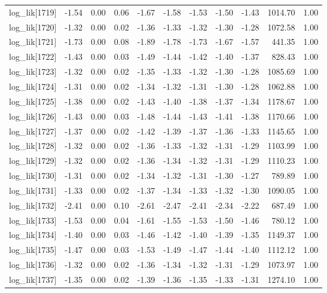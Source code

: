 \begin{table}[ht]
\begin{tabular}{rrrrrrrrrrr}
  log\_lik[1719] & -1.54 & 0.00 & 0.06 & -1.67 & -1.58 & -1.53 & -1.50 & -1.43 & 1014.70 & 1.00 \\ 
  log\_lik[1720] & -1.32 & 0.00 & 0.02 & -1.36 & -1.33 & -1.32 & -1.30 & -1.28 & 1072.58 & 1.00 \\ 
  log\_lik[1721] & -1.73 & 0.00 & 0.08 & -1.89 & -1.78 & -1.73 & -1.67 & -1.57 & 441.35 & 1.00 \\ 
  log\_lik[1722] & -1.43 & 0.00 & 0.03 & -1.49 & -1.44 & -1.42 & -1.40 & -1.37 & 828.43 & 1.00 \\ 
  log\_lik[1723] & -1.32 & 0.00 & 0.02 & -1.35 & -1.33 & -1.32 & -1.30 & -1.28 & 1085.69 & 1.00 \\ 
  log\_lik[1724] & -1.31 & 0.00 & 0.02 & -1.34 & -1.32 & -1.31 & -1.30 & -1.28 & 1062.88 & 1.00 \\ 
  log\_lik[1725] & -1.38 & 0.00 & 0.02 & -1.43 & -1.40 & -1.38 & -1.37 & -1.34 & 1178.67 & 1.00 \\ 
  log\_lik[1726] & -1.43 & 0.00 & 0.03 & -1.48 & -1.44 & -1.43 & -1.41 & -1.38 & 1170.66 & 1.00 \\ 
  log\_lik[1727] & -1.37 & 0.00 & 0.02 & -1.42 & -1.39 & -1.37 & -1.36 & -1.33 & 1145.65 & 1.00 \\ 
  log\_lik[1728] & -1.32 & 0.00 & 0.02 & -1.36 & -1.33 & -1.32 & -1.31 & -1.29 & 1103.99 & 1.00 \\ 
  log\_lik[1729] & -1.32 & 0.00 & 0.02 & -1.36 & -1.34 & -1.32 & -1.31 & -1.29 & 1110.23 & 1.00 \\ 
  log\_lik[1730] & -1.31 & 0.00 & 0.02 & -1.34 & -1.32 & -1.31 & -1.30 & -1.27 & 789.89 & 1.00 \\ 
  log\_lik[1731] & -1.33 & 0.00 & 0.02 & -1.37 & -1.34 & -1.33 & -1.32 & -1.30 & 1090.05 & 1.00 \\ 
  log\_lik[1732] & -2.41 & 0.00 & 0.10 & -2.61 & -2.47 & -2.41 & -2.34 & -2.22 & 687.49 & 1.00 \\ 
  log\_lik[1733] & -1.53 & 0.00 & 0.04 & -1.61 & -1.55 & -1.53 & -1.50 & -1.46 & 780.12 & 1.00 \\ 
  log\_lik[1734] & -1.40 & 0.00 & 0.03 & -1.46 & -1.42 & -1.40 & -1.39 & -1.35 & 1149.37 & 1.00 \\ 
  log\_lik[1735] & -1.47 & 0.00 & 0.03 & -1.53 & -1.49 & -1.47 & -1.44 & -1.40 & 1112.12 & 1.00 \\ 
  log\_lik[1736] & -1.32 & 0.00 & 0.02 & -1.36 & -1.34 & -1.32 & -1.31 & -1.29 & 1073.97 & 1.00 \\ 
  log\_lik[1737] & -1.35 & 0.00 & 0.02 & -1.39 & -1.36 & -1.35 & -1.33 & -1.31 & 1274.10 & 1.00 \\ 

\end{tabular}
\end{table}
